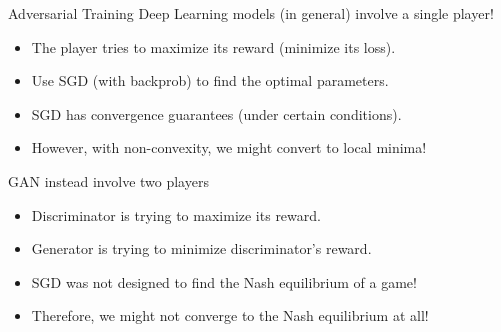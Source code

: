 \documentclass[11pt,compress,t,notes=noshow, xcolor=table]{beamer}
\begin{document}

%

%


\begin{frame} {Adversarial Training}  
  \vspace{2mm}
Deep Learning models (in general) involve a single player!
  \vspace{1mm}
  \begin{itemize}
    \item The player tries to maximize its reward (minimize its loss).
    \item Use SGD (with backprob) to find the optimal parameters.
    \item SGD has convergence guarantees (under certain conditions).
    \item However, with non-convexity, we might convert to local minima!
  \end{itemize}
    \vspace{3mm} 
GAN instead involve two players
     \vspace{1mm}
  \begin{itemize}
    \item Discriminator is trying to maximize its reward.
    \item Generator is trying to minimize discriminator's reward.
    \item  SGD was not designed to find the Nash equilibrium of a game!
    \item Therefore, we might not converge to the Nash equilibrium at all!
  \end{itemize}
  \vspace{2mm}
      
 \end{frame}
 
\end{document}
